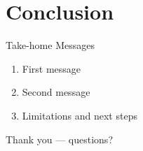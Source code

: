\documentclass[aspectratio=169]{beamer}
\begin{document}
\section{Conclusion}
\begin{frame}{Take-home Messages}
  \begin{enumerate}
    \item First message
    \item Second message
    \item Limitations and next steps
  \end{enumerate}
\end{frame}

\begin{frame}
  \centering
  \Large Thank you --- questions?
\end{frame}
\end{document}
